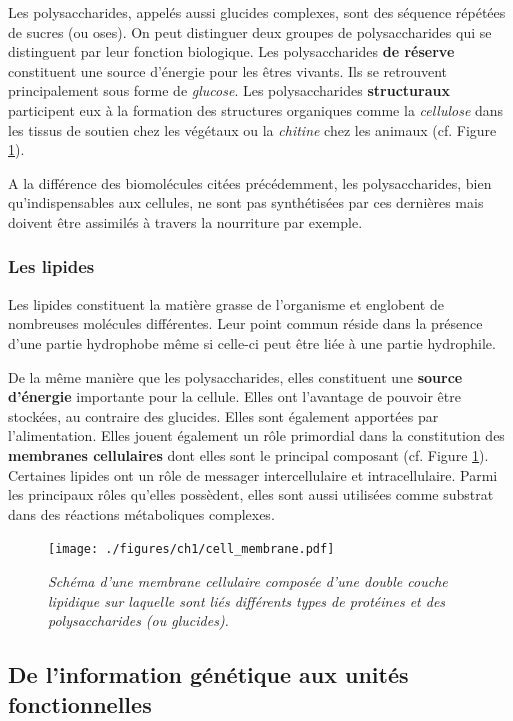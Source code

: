 Les polysaccharides, appelés aussi glucides complexes, sont des séquence répétées de sucres (ou oses). On peut distinguer deux groupes de polysaccharides qui se distinguent par leur fonction biologique. Les polysaccharides \textbf{de réserve} constituent une source d'énergie pour les êtres vivants. Ils se retrouvent principalement sous forme de \textit{glucose}.
Les polysaccharides \textbf{structuraux} participent eux à la formation des structures organiques comme la \textit{cellulose} dans les tissus de soutien chez les végétaux ou la \textit{chitine} chez les animaux (cf. Figure \ref{Fig:cell_membrane}).

A la différence des biomolécules citées précédemment, les polysaccharides, bien qu'indispensables aux cellules, ne sont pas synthétisées par ces dernières mais doivent être assimilés à travers la nourriture par exemple.

\subsubsection{Les lipides}

Les lipides constituent la matière grasse de l'organisme et englobent de nombreuses molécules différentes. Leur point commun réside dans la présence d'une partie hydrophobe même si celle-ci peut être liée à une partie hydrophile.

De la même manière que les polysaccharides, elles constituent une \textbf{source d'énergie} importante pour la cellule. Elles ont l'avantage de pouvoir être stockées, au contraire des glucides. Elles sont également apportées par l'alimentation.
Elles jouent également un rôle primordial dans la constitution des \textbf{membranes cellulaires} dont elles sont le principal composant (cf. Figure \ref{Fig:cell_membrane}).
Certaines lipides ont un rôle de messager intercellulaire et intracellulaire.
Parmi les principaux rôles qu'elles possèdent, elles sont aussi utilisées comme substrat dans des réactions métaboliques complexes.

\begin{figure}
  \centering
  {\texttt{[image: ./figures/ch1/cell\_membrane.pdf]}}
    \caption{\it Schéma d'une membrane cellulaire composée d'une double couche lipidique sur laquelle sont liés différents types de protéines et des polysaccharides (ou glucides).}
    \label{Fig:cell_membrane}
  \hspace{0.2cm}
\end{figure}


\subsection{De l'information génétique aux unités fonctionnelles} \label{trans_trad}

